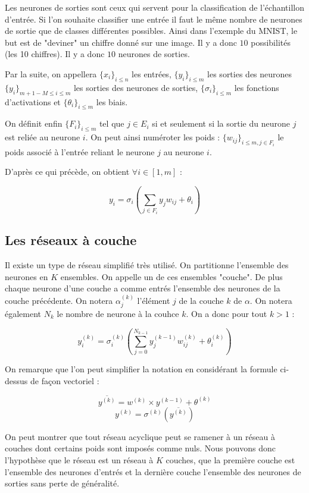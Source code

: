 \medskip

Les neurones de sorties sont ceux qui servent pour la classification de l'échantillon d'entrée. Si l'on souhaite classifier une entrée il faut le même nombre de neurones de sortie que de classes différentes possibles. Ainsi dans l'exemple du MNIST, le but est de "deviner" un chiffre donné sur une image. Il y a donc $10$ possibilités (les 10 chiffres). Il y a donc $10$ neurones de sorties.

\medskip

Par la suite, on appellera $\{x_i\}_{i \leq n}$ les entrées, $\{y_i\}_{i \leq m}$ les sorties des neurones $\{y_i\}_{m+1-M \leq i \leq m}$ les sorties des neurones de sorties, $\{\sigma_i\}_{i \leq m}$ les fonctions d'activations et $\{\theta_i\}_{i \leq m}$ les biais.

\medskip

On définit enfin $\{F_i\}_{i \leq m}$ tel que $j \in E_i$ si et seulement si la sortie du neurone $j$ est reliée au neurone $i$. On peut ainsi numéroter les poids : $\{w_{ij}\}_{i \leq m, j \in F_i} $ le poids associé à l'entrée reliant le neurone $j$ au neurone $i$.

\medskip

D'après ce qui précède, on obtient $\forall i \in [1, m]$ :

\[y_i = \sigma_i(\sum_{j \in F_i} y_jw_{ij} + \theta_i) \]

\subsection{Les réseaux à couche}

Il existe un type de réseau simplifié très utilisé. On partitionne l'ensemble des neurones en $K$ ensembles. On appelle un de ces ensembles "couche". De plus chaque neurone d'une couche a comme entrés l'ensemble des neurones de la couche précédente. On notera $\alpha^{(k)}_j$ l'élément $j$ de la couche $k$ de $\alpha$. On notera également $N_k$ le nombre de neurone à la couhce $k$.
On a donc pour tout $k > 1$ :

\[y_i^{(k)} = \sigma_i^{(k)}(\sum_{j = 0}^{N_{k-1}} y_j^{(k-1)}w_{ij}^{(k)} + \theta_i^{(k)}) \]

On remarque que l'on peut simplifier la notation en considérant la formule ci-dessus de façon vectoriel :

\[\overline{y^{(k)}} = w^{(k)} \times y^{(k-1)} + \theta^{(k)}\]
\[y^{(k)} = \sigma^{(k)}(\overline{y^{(k)}}) \]

On peut montrer que tout réseau acyclique peut se ramener à un réseau à couches dont certains poids sont imposés comme nuls. Nous pouvons donc l'hypothèse que le réseau est un réseau à $K$ couches, que la première couche est l'ensemble des neurones d'entrés et la dernière couche l'ensemble des neurones de sorties sans perte de généralité.

